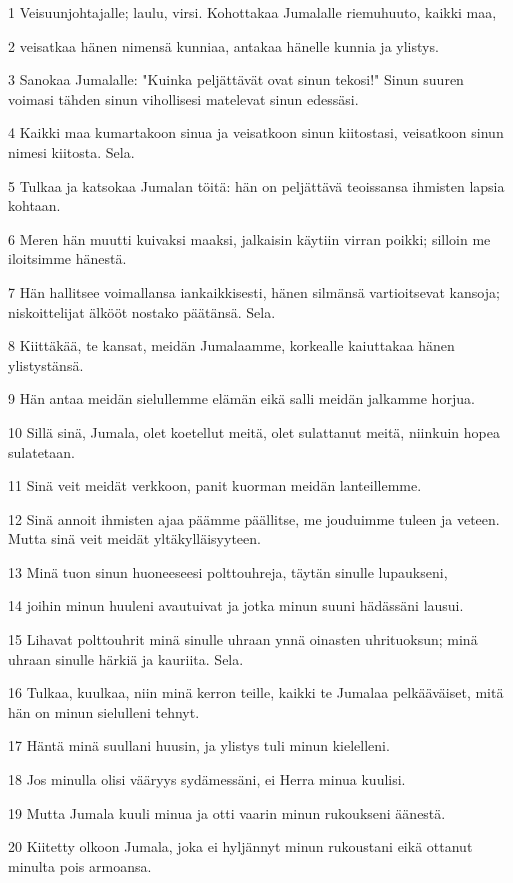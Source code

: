 \par 1 Veisuunjohtajalle; laulu, virsi. Kohottakaa Jumalalle riemuhuuto, kaikki maa,
\par 2 veisatkaa hänen nimensä kunniaa, antakaa hänelle kunnia ja ylistys.
\par 3 Sanokaa Jumalalle: "Kuinka peljättävät ovat sinun tekosi!" Sinun suuren voimasi tähden sinun vihollisesi matelevat sinun edessäsi.
\par 4 Kaikki maa kumartakoon sinua ja veisatkoon sinun kiitostasi, veisatkoon sinun nimesi kiitosta. Sela.
\par 5 Tulkaa ja katsokaa Jumalan töitä: hän on peljättävä teoissansa ihmisten lapsia kohtaan.
\par 6 Meren hän muutti kuivaksi maaksi, jalkaisin käytiin virran poikki; silloin me iloitsimme hänestä.
\par 7 Hän hallitsee voimallansa iankaikkisesti, hänen silmänsä vartioitsevat kansoja; niskoittelijat älkööt nostako päätänsä. Sela.
\par 8 Kiittäkää, te kansat, meidän Jumalaamme, korkealle kaiuttakaa hänen ylistystänsä.
\par 9 Hän antaa meidän sielullemme elämän eikä salli meidän jalkamme horjua.
\par 10 Sillä sinä, Jumala, olet koetellut meitä, olet sulattanut meitä, niinkuin hopea sulatetaan.
\par 11 Sinä veit meidät verkkoon, panit kuorman meidän lanteillemme.
\par 12 Sinä annoit ihmisten ajaa päämme päällitse, me jouduimme tuleen ja veteen. Mutta sinä veit meidät yltäkylläisyyteen.
\par 13 Minä tuon sinun huoneeseesi polttouhreja, täytän sinulle lupaukseni,
\par 14 joihin minun huuleni avautuivat ja jotka minun suuni hädässäni lausui.
\par 15 Lihavat polttouhrit minä sinulle uhraan ynnä oinasten uhrituoksun; minä uhraan sinulle härkiä ja kauriita. Sela.
\par 16 Tulkaa, kuulkaa, niin minä kerron teille, kaikki te Jumalaa pelkääväiset, mitä hän on minun sielulleni tehnyt.
\par 17 Häntä minä suullani huusin, ja ylistys tuli minun kielelleni.
\par 18 Jos minulla olisi vääryys sydämessäni, ei Herra minua kuulisi.
\par 19 Mutta Jumala kuuli minua ja otti vaarin minun rukoukseni äänestä.
\par 20 Kiitetty olkoon Jumala, joka ei hyljännyt minun rukoustani eikä ottanut minulta pois armoansa.


